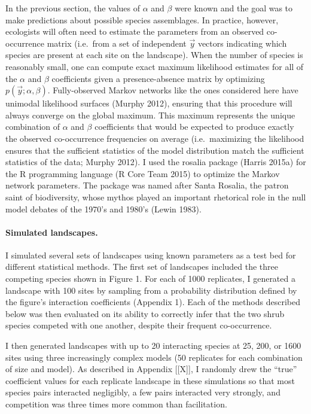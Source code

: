 \documentclass[12pt,]{article}
\begin{document}
\begin{spacing}{1.9}
\begin{flushleft}
In the previous section, the values of \(\alpha\) and \(\beta\) were
known and the goal was to make predictions about possible species
assemblages. In practice, however, ecologists will often need to
estimate the parameters from an observed co-occurrence matrix (i.e.~from
a set of independent \(\vec{y}\) vectors indicating which species are
present at each site on the landscape). When the number of species is
reasonably small, one can compute exact maximum likelihood estimates for
all of the \(\alpha\) and \(\beta\) coefficients given a
presence-absence matrix by optimizing \(p(\vec{y}; \alpha, \beta)\).
Fully-observed Markov networks like the ones considered here have
unimodal likelihood surfaces (Murphy 2012), ensuring that this procedure
will always converge on the global maximum. This maximum represents the
unique combination of \(\alpha\) and \(\beta\) coefficients that would
be expected to produce exactly the observed co-occurrence frequencies on
average (i.e.~maximizing the likelihood ensures that the sufficient
statistics of the model distribution match the sufficient statistics of
the data; Murphy 2012). I used the rosalia package (Harris 2015a) for
the R programming language (R Core Team 2015) to optimize the Markov
network parameters. The package was named after Santa Rosalia, the
patron saint of biodiversity, whose mythos played an important
rhetorical role in the null model debates of the 1970's and 1980's
(Lewin 1983).

\paragraph{Simulated landscapes.}\label{simulated-landscapes.}

I simulated several sets of landscapes using known parameters as a test
bed for different statistical methods. The first set of landscapes
included the three competing species shown in Figure 1. For each of 1000
replicates, I generated a landscape with 100 sites by sampling from a
probability distribution defined by the figure's interaction
coefficients (Appendix 1). Each of the methods described below was then
evaluated on its ability to correctly infer that the two shrub species
competed with one another, despite their frequent co-occurrence.

I then generated landscapes with up to 20 interacting species at 25,
200, or 1600 sites using three increasingly complex models (50
replicates for each combination of size and model). As described in
Appendix {[}{[}X{]}{]}, I randomly drew the ``true'' coefficient values
for each replicate landscape in these simulations so that most species
pairs interacted negligibly, a few pairs interacted very strongly, and
competition was three times more common than facilitation.


\end{flushleft}
\end{spacing}
\end{document}
